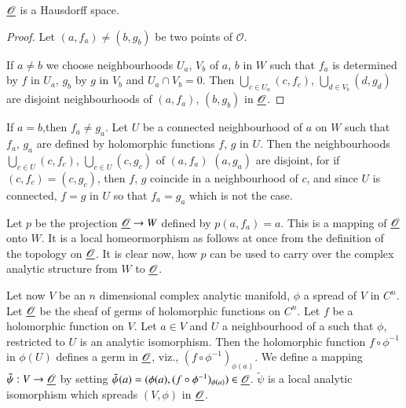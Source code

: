 \setcounter{proposition}{0}
\begin{proposition}\label{chap4:prop1}
$\underline{\mathscr{O}}$ is a Hausdorff space.
\end{proposition}

\begin{proof}
Let $(a, f_a) \neq (b, g_b)$ be two points of $\mathscr{O}$.

If $a \neq b$ we choose neighbourhoods $U_a$, $V_b$ of $a$, $b$ in $W$
such that $f_a$ is determined by $f$ in $U_a$, $g_b$ by $g$ in $V_b$
and $U_a \cap V_b = 0$. Then $\bigcup\limits_{c \in U_a} (c , f_c)$,
$\bigcup\limits_{d\in V_b} (d, g_d)$ are disjoint neighbourhoods of
$(a, f_a)$, $(b, g_b)$ in $\underline{\mathscr{O}}$. 
\end{proof}

If $a = b$,\pageoriginale then $f_a \neq g_a$. Let $U$ be a connected
neighbourhood of $a$ on $W$ such that $f_a$, $g_a$ are defined by
holomorphic functions $f$, $g$ in $U$. Then the neighbourhoods
$\bigcup\limits_{c \in U} (c, f_c)$, $\bigcup\limits_{c \in U}(c,
g_c)$ of $(a, f_a)$ $(a, g_a)$ are disjoint, for if $(c, f_c) = (c,
g_c)$, then $f$, $g$ coincide in a neighbourhood of $c$, and since $U$
is connected, $f = g$ in $U$ so that $f_a = g_a$ which is not the
case. 

Let $p$ be the projection $\underline{\mathscr{O}} \to W$ defined by $p(a,
f_a) =a$. This is a mapping of $\underline{\mathscr{O}}$ onto $W$. It is a
local homeormorphism as follows at once from the definition of the
topology on $\underline{\mathscr{O}}$. It is clear now, how $p$ can be used to
carry over the complex analytic structure from $W$ to
$\underline{\mathscr{O}}$. 

Let now $V$ be an $n$ dimensional complex analytic manifold, $\phi$ a
spread of $V$ in $C^n$. Let $\underline{\mathscr{O}}$ be the sheaf of germs of
holomorphic functions on $C^n$. Let $f$ be a holomorphic function on
$V$. Let $a \in V$ and $U$ a neighbourhood of a such that $\phi$,
restricted to $U$ is an analytic isomorphism. Then the holomorphic
function $f \circ \phi^{-1}$ in $\phi (U)$ defines a germ in
$\underline{\mathscr{O}}$, viz., $(f \circ \phi^{-1})_{\phi (a)}$. We define a
mapping $\tilde{\psi} : V \to \underline{\mathscr{O}}$ by setting
$\tilde{\psi}(a) = (\phi(a), (f \circ \phi^{-1})_{\phi (a)}) \in
\underline{\mathscr{O}}$. $\tilde{\psi}$ is a local analytic isomorphism which
spreads $(V, \phi)$ in $\underline{\mathscr{O}}$.

